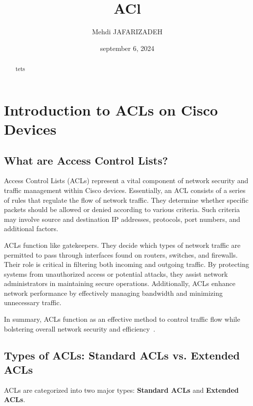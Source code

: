 \documentclass[11pt,a4paper]{article}
\title{ACl}
\author{Mehdi JAFARIZADEH}
\date{september 6, 2024}
\begin{document}
\maketitle

\begin{abstract}
    tets
\end{abstract}

\newpage

\section*{Introduction to ACLs on Cisco Devices}
    \subsection*{What are Access Control Lists?}
        Access Control Lists (ACLs) represent a vital component of network security and traffic management within Cisco devices. Essentially, an ACL consists of a series of rules that regulate the flow of network traffic. They determine whether specific packets should be allowed or denied according to various criteria. Such criteria may involve source and destination IP addresses, protocols, port numbers, and additional factors.

        ACLs function like gatekeepers. They decide which types of network traffic are permitted to pass through interfaces found on routers, switches, and firewalls. Their role is critical in filtering both incoming and outgoing traffic. By protecting systems from unauthorized access or potential attacks, they assist network administrators in maintaining secure operations. Additionally, ACLs enhance network performance by effectively managing bandwidth and minimizing unnecessary traffic.

        In summary, ACLs function as an effective method to control traffic flow while bolstering overall network security and efficiency~\cite{Introduction}.

    

    \subsection*{Types of ACLs: Standard ACLs vs. Extended ACLs}
        ACLs are categorized into two major types: \textbf{Standard ACLs} and \textbf{Extended ACLs}.
\end{document}
